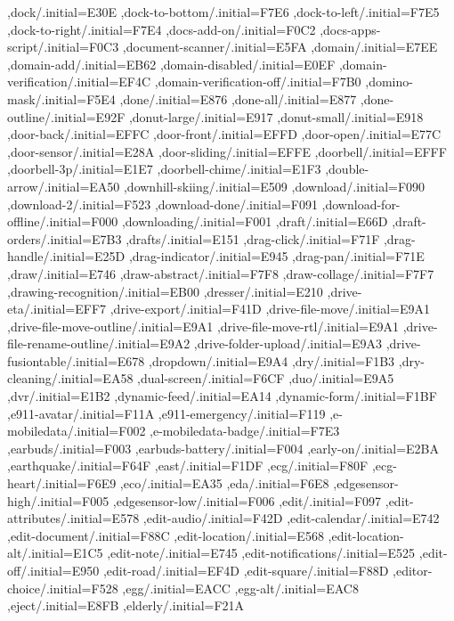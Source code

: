 { ,dock/.initial=E30E
 ,dock-to-bottom/.initial=F7E6
 ,dock-to-left/.initial=F7E5
 ,dock-to-right/.initial=F7E4
 ,docs-add-on/.initial=F0C2
 ,docs-apps-script/.initial=F0C3
 ,document-scanner/.initial=E5FA
 ,domain/.initial=E7EE
 ,domain-add/.initial=EB62
 ,domain-disabled/.initial=E0EF
 ,domain-verification/.initial=EF4C
 ,domain-verification-off/.initial=F7B0
 ,domino-mask/.initial=F5E4
 ,done/.initial=E876
 ,done-all/.initial=E877
 ,done-outline/.initial=E92F
 ,donut-large/.initial=E917
 ,donut-small/.initial=E918
 ,door-back/.initial=EFFC
 ,door-front/.initial=EFFD
 ,door-open/.initial=E77C
 ,door-sensor/.initial=E28A
 ,door-sliding/.initial=EFFE
 ,doorbell/.initial=EFFF
 ,doorbell-3p/.initial=E1E7
 ,doorbell-chime/.initial=E1F3
 ,double-arrow/.initial=EA50
 ,downhill-skiing/.initial=E509
 ,download/.initial=F090
 ,download-2/.initial=F523
 ,download-done/.initial=F091
 ,download-for-offline/.initial=F000
 ,downloading/.initial=F001
 ,draft/.initial=E66D
 ,draft-orders/.initial=E7B3
 ,drafts/.initial=E151
 ,drag-click/.initial=F71F
 ,drag-handle/.initial=E25D
 ,drag-indicator/.initial=E945
 ,drag-pan/.initial=F71E
 ,draw/.initial=E746
 ,draw-abstract/.initial=F7F8
 ,draw-collage/.initial=F7F7
 ,drawing-recognition/.initial=EB00
 ,dresser/.initial=E210
 ,drive-eta/.initial=EFF7
 ,drive-export/.initial=F41D
 ,drive-file-move/.initial=E9A1
 ,drive-file-move-outline/.initial=E9A1
 ,drive-file-move-rtl/.initial=E9A1
 ,drive-file-rename-outline/.initial=E9A2
 ,drive-folder-upload/.initial=E9A3
 ,drive-fusiontable/.initial=E678
 ,dropdown/.initial=E9A4
 ,dry/.initial=F1B3
 ,dry-cleaning/.initial=EA58
 ,dual-screen/.initial=F6CF
 ,duo/.initial=E9A5
 ,dvr/.initial=E1B2
 ,dynamic-feed/.initial=EA14
 ,dynamic-form/.initial=F1BF
 ,e911-avatar/.initial=F11A
 ,e911-emergency/.initial=F119
 ,e-mobiledata/.initial=F002
 ,e-mobiledata-badge/.initial=F7E3
 ,earbuds/.initial=F003
 ,earbuds-battery/.initial=F004
 ,early-on/.initial=E2BA
 ,earthquake/.initial=F64F
 ,east/.initial=F1DF
 ,ecg/.initial=F80F
 ,ecg-heart/.initial=F6E9
 ,eco/.initial=EA35
 ,eda/.initial=F6E8
 ,edgesensor-high/.initial=F005
 ,edgesensor-low/.initial=F006
 ,edit/.initial=F097
 ,edit-attributes/.initial=E578
 ,edit-audio/.initial=F42D
 ,edit-calendar/.initial=E742
 ,edit-document/.initial=F88C
 ,edit-location/.initial=E568
 ,edit-location-alt/.initial=E1C5
 ,edit-note/.initial=E745
 ,edit-notifications/.initial=E525
 ,edit-off/.initial=E950
 ,edit-road/.initial=EF4D
 ,edit-square/.initial=F88D
 ,editor-choice/.initial=F528
 ,egg/.initial=EACC
 ,egg-alt/.initial=EAC8
 ,eject/.initial=E8FB
 ,elderly/.initial=F21A
}
